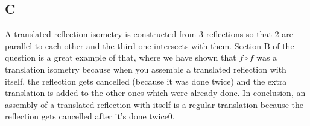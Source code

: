 \documentclass[12pt, oneside]{article}
\begin{document}
\subsection{C}
A translated reflection isometry is constructed from 3 reflections so that 2 are parallel to each other and the third one intersects with them. Section B of the question is a great example of that, where we have shown that $f \circ f$ was a translation isometry because when you assemble a translated reflection with itself, the reflection gets cancelled (because it was done twice) and the extra translation is added to the other ones which were already done. In conclusion, an assembly of a translated reflection with itself is a regular translation because the reflection gets cancelled after it's done twice0.
\end{document}
